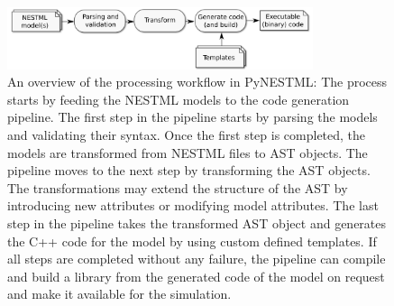 \begin{figure}[ht!]
\centering
\includegraphics[width=0.8\textwidth]{src/pic/internal_workflow.png}
\caption{An overview of the processing workflow in PyNESTML: The process starts by feeding the NESTML models to the code generation pipeline. The first step in the pipeline starts by parsing the models and validating their syntax. Once the first step is completed, the models are transformed from NESTML files to AST objects. The pipeline moves to the next step by transforming the AST objects. The transformations may extend the structure of the AST by introducing new attributes or modifying model attributes. The last step in the pipeline takes the transformed AST object and generates the C++ code for the model by using custom defined templates. If all steps are completed without any failure, the pipeline can compile and build a library from the generated code of the model on request and make it available for the simulation.}
\label{fig:pynestml_workflow}
\end{figure}



